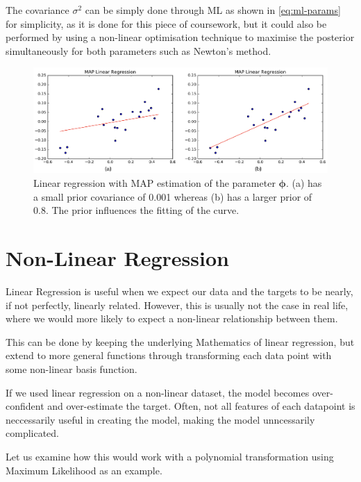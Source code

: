 \documentclass[11pt,openright,a4paper]{article}
\numberwithin{equation}{section}
\begin{document}
The covariance $\sigma^2$ can be simply done through ML as shown in \autoref{eq:ml-params} for simplicity, as it is done for this piece of coursework, but it could also be performed by using a non-linear optimisation technique to maximise the posterior simultaneously for both parameters such as Newton's method.


\begin{figure}[H]
  \centering
  \includegraphics[width=1\textwidth]{lin-map-combined}
    \caption{Linear regression with MAP estimation of the parameter $\boldsymbol\phi$. (a) has a small prior covariance of 0.001 whereas (b) has a larger prior of 0.8. The prior influences the fitting of the curve.}
  \label{fig:lin-map-combined}
\end{figure}



\section{Non-Linear Regression} \label{sec:discussion}
Linear Regression is useful when we expect our data and the targets to be nearly, if not perfectly, linearly related. However, this is usually not the case in real life, where we would more likely to expect a non-linear relationship between them.

This can be done by keeping the underlying Mathematics of linear regression, but extend to more general functions through transforming each data point with some non-linear basis function.

If we used linear regression on a non-linear dataset, the model becomes over-confident and over-estimate the target. Often, not all features of each datapoint is neccessarily useful in creating the model, making the model unncessarily complicated.

Let us examine how this would work with a polynomial transformation using Maximum Likelihood as an example.
\end{document}
